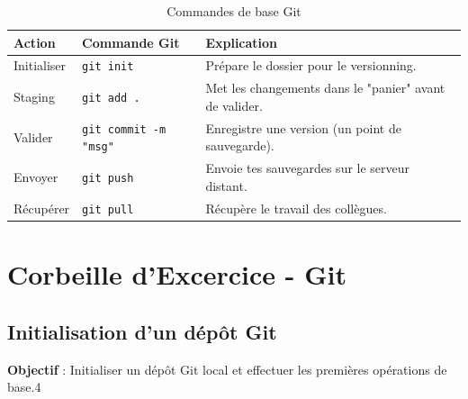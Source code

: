 \begin{table}[ht]
    \centering
    \begin{tabularx}{\textwidth}{l l X}
        \toprule
        \textbf{Action} & \textbf{Commande Git} & \textbf{Explication} \\
        \midrule
        Initialiser & \texttt{git init} & Prépare le dossier pour le versionning. \\
        \addlinespace
        Staging & \texttt{git add .} & Met les changements dans le "panier" avant de valider. \\
        \addlinespace
        Valider & \texttt{git commit -m "msg"} & Enregistre une version (un point de sauvegarde). \\
        \addlinespace
        Envoyer & \texttt{git push} & Envoie tes sauvegardes sur le serveur distant. \\
        \addlinespace
        Récupérer & \texttt{git pull} & Récupère le travail des collègues. \\
        \bottomrule
    \end{tabularx}
	\caption{Commandes de base Git}
\end{table}
    

\newpage

\section*{Corbeille d'Excercice - Git}

\subsection*{Initialisation d'un dépôt Git}
{}
\noindent \textbf{Objectif} : Initialiser un dépôt Git local et effectuer les premières opérations de base.4

